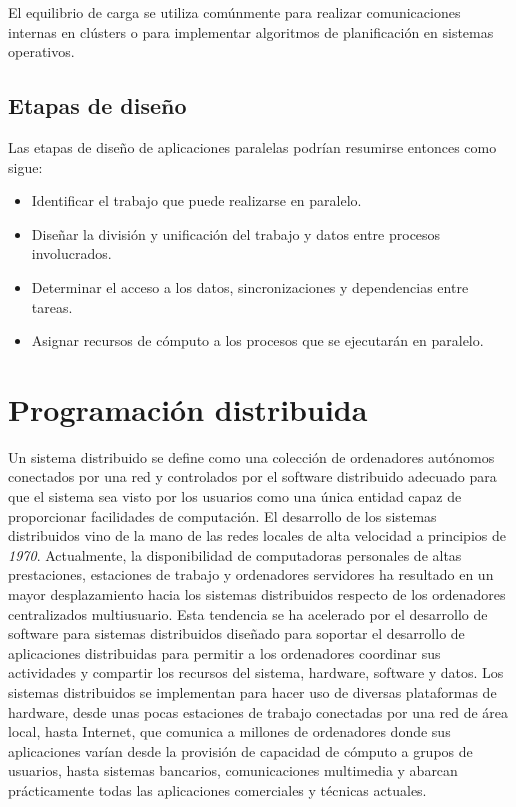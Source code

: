 El equilibrio de carga se utiliza comúnmente para realizar comunicaciones internas en clústers o para implementar algoritmos de planificación en sistemas operativos.

\subsection{Etapas de diseño}

Las etapas de diseño de aplicaciones paralelas podrían resumirse entonces como sigue:
\begin{itemize}
 \item Identificar el trabajo que puede realizarse en paralelo.
 \item Diseñar la división y unificación del trabajo y datos entre procesos involucrados.
 \item Determinar el acceso a los datos, sincronizaciones y dependencias entre tareas.
 \item Asignar recursos de cómputo a los procesos que se ejecutarán en paralelo.
\end{itemize}


\section{Programación distribuida}

Un sistema distribuido se define como una colección de ordenadores autónomos conectados por una red y controlados por el software distribuido adecuado para que el sistema sea visto por los usuarios como una única entidad capaz de proporcionar facilidades de computación. El desarrollo de los sistemas distribuidos vino de la mano de las redes locales de alta velocidad
 a principios de \textit{1970}. Actualmente, la disponibilidad de computadoras personales de altas prestaciones, estaciones de trabajo y ordenadores servidores ha resultado en un mayor desplazamiento
 hacia los sistemas distribuidos respecto de los ordenadores centralizados multiusuario. Esta tendencia se ha acelerado por el desarrollo de software para sistemas distribuidos diseñado
 para soportar el desarrollo de aplicaciones distribuidas para permitir a los ordenadores coordinar sus actividades y compartir los recursos del sistema, hardware, software y datos.
Los sistemas distribuidos se implementan para hacer uso de diversas plataformas de hardware, desde unas pocas estaciones de trabajo conectadas por una red de área local, hasta Internet,
 que comunica a millones de ordenadores donde sus aplicaciones varían desde la provisión de capacidad de cómputo a grupos de usuarios, hasta sistemas bancarios, comunicaciones multimedia y
 abarcan prácticamente todas las aplicaciones comerciales y técnicas actuales. 

